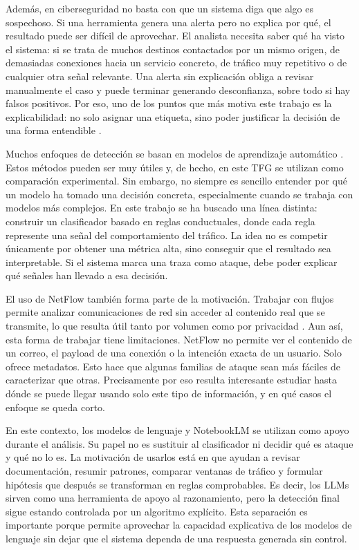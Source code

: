 Además, en ciberseguridad no basta con que un sistema diga que algo es sospechoso. Si una herramienta genera una alerta pero no explica por qué, el resultado puede ser difícil de aprovechar. El analista necesita saber qué ha visto el sistema: si se trata de muchos destinos contactados por un mismo origen, de demasiadas conexiones hacia un servicio concreto, de tráfico muy repetitivo o de cualquier otra señal relevante. Una alerta sin explicación obliga a revisar manualmente el caso y puede terminar generando desconfianza, sobre todo si hay falsos positivos. Por eso, uno de los puntos que más motiva este trabajo es la explicabilidad: no solo asignar una etiqueta, sino poder justificar la decisión de una forma entendible \cite{rudin2019stop}.

Muchos enfoques de detección se basan en modelos de aprendizaje automático \cite{buczak2016survey}. Estos métodos pueden ser muy útiles y, de hecho, en este TFG se utilizan como comparación experimental. Sin embargo, no siempre es sencillo entender por qué un modelo ha tomado una decisión concreta, especialmente cuando se trabaja con modelos más complejos. En este trabajo se ha buscado una línea distinta: construir un clasificador basado en reglas conductuales, donde cada regla represente una señal del comportamiento del tráfico. La idea no es competir únicamente por obtener una métrica alta, sino conseguir que el resultado sea interpretable. Si el sistema marca una traza como ataque, debe poder explicar qué señales han llevado a esa decisión.

El uso de NetFlow también forma parte de la motivación. Trabajar con flujos permite analizar comunicaciones de red sin acceder al contenido real que se transmite, lo que resulta útil tanto por volumen como por privacidad \cite{rfc3954}. Aun así, esta forma de trabajar tiene limitaciones. NetFlow no permite ver el contenido de un correo, el payload de una conexión o la intención exacta de un usuario. Solo ofrece metadatos. Esto hace que algunas familias de ataque sean más fáciles de caracterizar que otras. Precisamente por eso resulta interesante estudiar hasta dónde se puede llegar usando solo este tipo de información, y en qué casos el enfoque se queda corto.

En este contexto, los modelos de lenguaje y NotebookLM se utilizan como apoyo durante el análisis. Su papel no es sustituir al clasificador ni decidir qué es ataque y qué no lo es. La motivación de usarlos está en que ayudan a revisar documentación, resumir patrones, comparar ventanas de tráfico y formular hipótesis que después se transforman en reglas comprobables. Es decir, los LLMs sirven como una herramienta de apoyo al razonamiento, pero la detección final sigue estando controlada por un algoritmo explícito. Esta separación es importante porque permite aprovechar la capacidad explicativa de los modelos de lenguaje sin dejar que el sistema dependa de una respuesta generada sin control.

